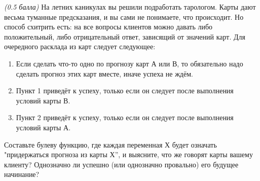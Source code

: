 \question
\textit{(0.5 балла)} На летних каникулах вы решили подработать тарологом. Карты дают весьма туманные предсказания, и вы сами не понимаете, что происходит. Но способ схитрить есть: на все вопросы клиентов можно давать либо положительный, либо отрицательный ответ, зависящий от значений карт. Для очередного расклада из карт следует следующее:

\begin{enumerate}
\item Если сделать что-то одно по прогнозу карт А или В, то обязательно надо сделать прогноз этих карт вместе, иначе успеха не ждём.
\item Пункт 1 приведёт к успеху, только если он следует после выполнения условий карты В.
\item Пункт 2 приведёт к успеху, только если он следует после выполнения условий карты А.
\end{enumerate}

Составьте булеву функцию, где каждая переменная Х будет означать "придержаться прогноза из карты Х”, и выясните, что же говорят карты вашему клиенту? Однозначно ли успешно (или однозначно провально) его будущее начинание?